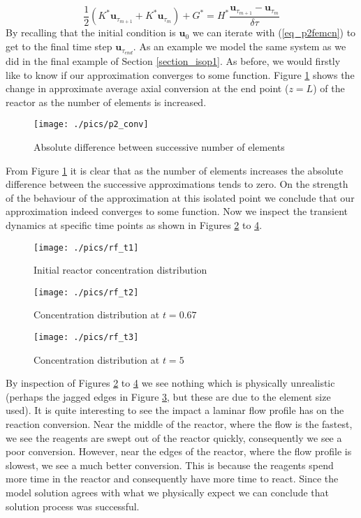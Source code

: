 \documentclass[11pt,fleqn]{article}
\theoremstyle{defstyle}
\begin{document}
\begin{equation}
\frac{1}{2}\left(K^*\mathbf{u}_{\tau_{m+1}} +K^*\mathbf{u}_{\tau_{m}}\right) + G^* = H^*\frac{\mathbf{u}_{\tau_{m+1}}-\mathbf{u}_{\tau_{m}}}{\delta \tau}
\label{eq_p2femcn}
\end{equation}
By recalling that the initial condition is $\mathbf{u}_0$ we can iterate with (\ref{eq_p2femcn}) to get to the final time step $\mathbf{u}_{\tau_{end}}$. As an example we model the same system as we did in the final example of Section \ref{section_isop1}. As before, we would firstly like to know if  our approximation converges to some function. Figure \ref{fig_p2conv} shows the change in approximate average axial conversion at the end point ($z=L$) of the reactor as the number of elements is increased.
\begin{figure}[H] 
\centering
\texttt{[image: ./pics/p2\_conv]}
\caption{Absolute difference between successive number of elements} 
\label{fig_p2conv}
\end{figure}
From Figure \ref{fig_p2conv} it is clear that as the number of elements increases the absolute difference between the successive approximations tends to zero. On the strength of the behaviour of the approximation at this isolated point we conclude that our approximation indeed converges to some function. Now we inspect the transient dynamics at specific time points as shown in Figures \ref{fig_rft1} to \ref{fig_rft3}.
\begin{figure}[H] 
\centering
\texttt{[image: ./pics/rf\_t1]}
\caption{Initial reactor concentration distribution} 
\label{fig_rft1}
\end{figure}
\begin{figure}[H] 
\centering
\texttt{[image: ./pics/rf\_t2]}
\caption{Concentration distribution at $t=0.67$} 
\label{fig_rft2}
\end{figure}
\begin{figure}[H] 
\centering
\texttt{[image: ./pics/rf\_t3]}
\caption{Concentration distribution at $t=5$} 
\label{fig_rft3}
\end{figure}
By inspection of Figures \ref{fig_rft1} to \ref{fig_rft3} we see nothing which is physically unrealistic (perhaps the jagged edges in Figure \ref{fig_rft2}, but these are due to the element size used). It is quite interesting to see the impact a laminar flow profile has on the reaction conversion. Near the middle of the reactor, where the flow is the fastest, we see the reagents are swept out of the reactor quickly, consequently we see a poor conversion. However, near the edges of the reactor, where the flow profile is slowest, we see a much better conversion. This is because the reagents spend more time in the reactor and consequently have more time to react. Since the model solution agrees with what we physically expect we can conclude that solution process was successful.
\end{document}
